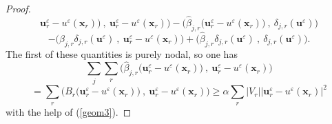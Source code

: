 \documentclass[a4paper,french,english,10pt]{article}
\newcommand\eps{\varepsilon}
\newcommand\x{\mathbf{x}}
\begin{document}
\begin{proof}
$$\textbf{u}_r^{\eps}- u^\eps(\x_r)
\bigg ) 
\: , \: \textbf{u}_r^{\eps}-u^\eps(\x_r)
 \bigg)
-
\bigg( \widehat{\beta}_{j,r}\bigg(
\textbf{u}_r^{\eps}- u^\eps(\x_r)
\bigg ) 
\: , \: \delta_{j,r}(\textbf{u}^{\eps})
 \bigg)
$$
\begin{equation} \label{eq:bb1}
-
\bigg( 
\widehat{\beta}_{j,r} \delta_{j,r}(\textbf{u}^{\eps})
\: , \:
\textbf{u}_r^{\eps}- u^\eps(\x_r)
 \bigg)
+
\bigg( 
\widehat{\beta}_{j,r} \delta_{j,r}(\textbf{u}^{\eps})
\: , \:
 \delta_{j,r}(\textbf{u}^{\eps})
 \bigg).
\end{equation}
The first of these quantities is purely nodal, so one has
$$
\sum_j \sum_r \bigg( \widehat{\beta}_{j,r}\bigg(
\textbf{u}_r^{\eps}- u^\eps(\x_r)
\bigg ) 
\: , \: \textbf{u}_r^{\eps}-u^\eps(\x_r)
 \bigg)
$$
\begin{equation} \label{eq:ss2}
=
 \sum_r \bigg( B_{r}\bigg(
\textbf{u}_r^{\eps}- u^\eps(\x_r)
\bigg ) 
\: , \: \textbf{u}_r^{\eps}-u^\eps(\x_r)
 \bigg)\geq \alpha \sum_r |V_r| | 
 \textbf{u}_r^{\eps}-
 u^\eps(\x_r) |^2
\end{equation}
with the help of (\ref{geom3}). 





\end{proof}
\end{document}
